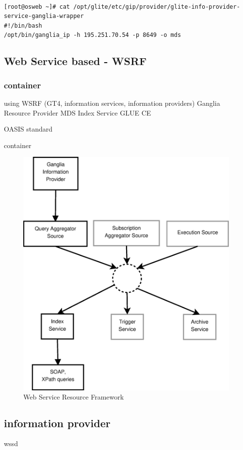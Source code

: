 \begin{lstlisting}

[root@osweb ~]# cat /opt/glite/etc/gip/provider/glite-info-provider-service-ganglia-wrapper
#!/bin/bash
/opt/bin/ganglia_ip -h 195.251.70.54 -p 8649 -o mds
\end{lstlisting}


\subsection{Web Service based - WSRF}
\subsubsection{container}
using WSRF (GT4, information services, information providers)
Ganglia Resource Provider
MDS Index Service
GLUE CE 

OASIS standard

container
\begin{figure}[htb]
\centering
 \includegraphics[width=5in]{images/wsrf.eps}
\caption{Web Service Resource Framework}
\label{figure:wsrf}
\end{figure}

\subsection{information provider}
wssd

